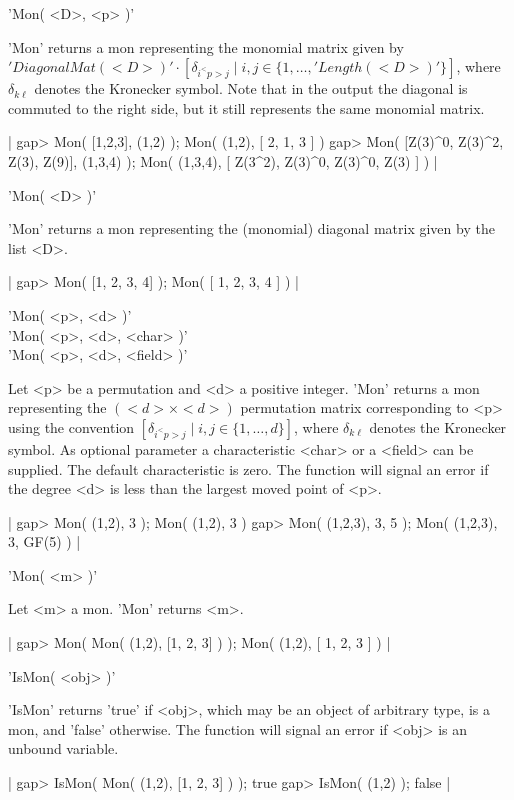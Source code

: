 'Mon( <D>, <p> )'

'Mon' returns a mon representing the monomial matrix given by 
$'DiagonalMat( <D> )'\cdot
[\delta_{i^<p>j}\mid i,j\in\{1,\dots,'Length( <D> )'\}]$,
where $\delta_{k\ell}$ denotes the Kronecker symbol.
Note that in the output the diagonal is commuted to the right side, 
but it still represents the same monomial matrix.

|    gap> Mon( [1,2,3], (1,2) );
    Mon(
      (1,2),
      [ 2, 1, 3 ]
    )
    gap> Mon( [Z(3)^0, Z(3)^2, Z(3), Z(9)], (1,3,4) ); 
    Mon(
      (1,3,4),
      [ Z(3^2), Z(3)^0, Z(3)^0, Z(3) ]
    ) |

'Mon( <D> )'

'Mon' returns a mon representing the (monomial) diagonal matrix
given by the list <D>.

|    gap> Mon( [1, 2, 3, 4] );
    Mon( [ 1, 2, 3, 4 ] ) |

'Mon( <p>, <d> )'\\
'Mon( <p>, <d>, <char> )'\\
'Mon( <p>, <d>, <field> )'

Let <p> be a permutation and <d> a positive integer. 'Mon'
returns a mon representing the $(<d>\times<d>)$ permutation matrix
corresponding to <p> using the convention 
$[\delta_{i^<p>j}\mid i,j\in\{1,\dots,d\}]$, where 
$\delta_{k\ell}$ denotes the Kronecker symbol. As optional parameter 
a characteristic <char> or a <field> can be supplied. 
The default characteristic is zero. The function will signal 
an error if the degree <d> is less than the largest moved point of <p>.

|    gap> Mon( (1,2), 3 );
    Mon( (1,2), 3 )
    gap> Mon( (1,2,3), 3, 5 );
    Mon( (1,2,3), 3, GF(5) ) |

'Mon( <m> )'

Let <m> a mon. 'Mon' returns <m>.

|    gap> Mon( Mon( (1,2), [1, 2, 3] ) );
    Mon(
      (1,2),
      [ 1, 2, 3 ]
    ) |

%

'IsMon( <obj> )'

'IsMon'  returns  'true' if  <obj>,  which may  be  an object of
arbitrary type, is a mon, and  'false' otherwise. The function
will signal an error if <obj> is an unbound variable.

|    gap> IsMon( Mon( (1,2), [1, 2, 3] ) );
    true
    gap> IsMon( (1,2) );
    false |

